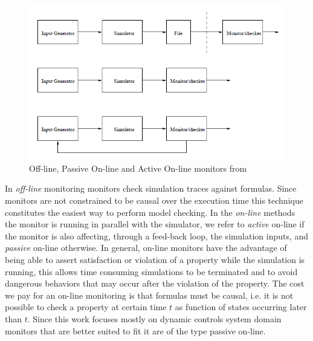 \begin{figure}[!h]
	\centering 
     \includegraphics[width=.8\textwidth]{Figs/monitortypes.png} 
     \caption{Off-line, Passive On-line and Active On-line monitors from \citep{maler2008checking}} 
     \label{fig:monitortypes} 
\end{figure} 
In \textit{off-line} monitoring monitors check simulation traces against formulas. Since monitors are not constrained to be causal over the execution time this technique constitutes the easiest way to perform model checking. In the \textit{on-line} methods the monitor is running in parallel with the simulator, we refer to \textit{active} on-line if the monitor is also affecting, through a feed-back loop, the simulation inputs, and \textit{passive} on-line otherwise. 
In general, on-line monitors have the advantage of being able to assert satisfaction or violation of a property while the simulation is running, this allows time consuming simulations to be terminated and to avoid dangerous behaviors that may occur after the violation of the property. The cost we pay for an on-line monitoring is that formulas must be causal, i.e. it is not possible to check a property at certain time $t$ as function of states occurring later than $t$. Since this work focuses mostly on dynamic controls system domain monitors that are better suited to fit it are of the type passive on-line. 

